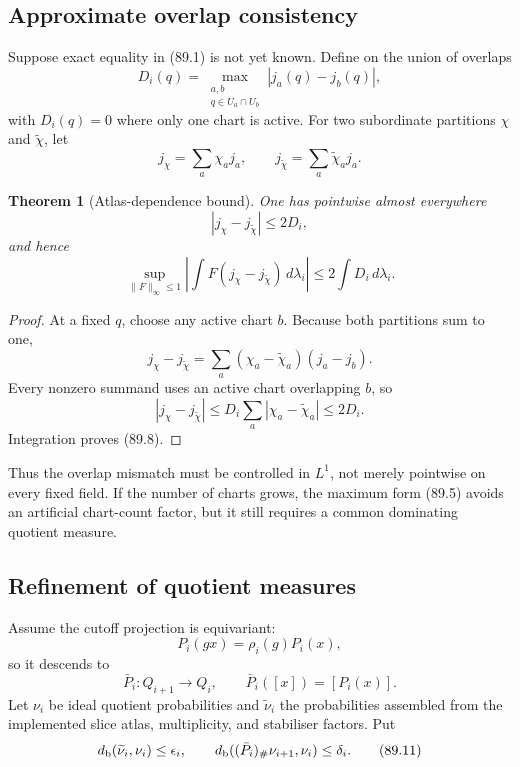 \documentclass[11pt]{article}
\newtheorem{theorem}{Theorem}[section]
\begin{document}
\subsection{Approximate overlap consistency}

Suppose exact equality in (89.1) is not yet known.  Define on the
union of overlaps
\[
 D_i(q)=
 \max_{\substack{a,b\\q\in U_a\cap U_b}}|j_a(q)-j_b(q)|,     \tag{89.5}
\]
with \(D_i(q)=0\) where only one chart is active.  For two subordinate
partitions \(\chi\) and \(\widetilde\chi\), let
\[
 j_\chi=\sum_a\chi_aj_a,\qquad
 j_{\widetilde\chi}=\sum_a\widetilde\chi_aj_a.               \tag{89.6}
\]

\begin{theorem}[Atlas-dependence bound]
\label{thm:v11v89-atlas}
One has pointwise almost everywhere
\[
                              |j_\chi-j_{\widetilde\chi}|
                              \le2D_i,                        \tag{89.7}
\]
and hence
\[
 \sup_{\|F\|_\infty\le1}
 \left|\int F(j_\chi-j_{\widetilde\chi})\,d\lambda_i\right|
                       \le2\int D_i\,d\lambda_i.             \tag{89.8}
\]
\end{theorem}

\begin{proof}
At a fixed \(q\), choose any active chart \(b\).  Because both
partitions sum to one,
\[
 j_\chi-j_{\widetilde\chi}
 =\sum_a(\chi_a-\widetilde\chi_a)(j_a-j_b).
\]
Every nonzero summand uses an active chart overlapping \(b\), so
\[
 |j_\chi-j_{\widetilde\chi}|
 \le D_i\sum_a|\chi_a-\widetilde\chi_a|
 \le2D_i.
\]
Integration proves (89.8).
\end{proof}

Thus the overlap mismatch must be controlled in \(L^1\), not merely
pointwise on every fixed field.  If the number of charts grows, the
maximum form (89.5) avoids an artificial chart-count factor, but it
still requires a common dominating quotient measure.

\subsection{Refinement of quotient measures}

Assume the cutoff projection is equivariant:
\[
                        P_i(gx)=\rho_i(g)P_i(x),             \tag{89.9}
\]
so it descends to
\[
                     \bar P_i:Q_{i+1}\longrightarrow Q_i,
                      \qquad \bar P_i([x])=[P_i(x)].         \tag{89.10}
\]
Let \(\nu_i\) be ideal quotient probabilities and
\(\widetilde\nu_i\) the probabilities assembled from the implemented
slice atlas, multiplicity, and stabiliser factors.  Put
\[
 d_{\rm b}(\widetilde\nu_i,\nu_i)\le\epsilon_i,\qquad
 d_{\rm b}((\bar P_i)_\#\nu_{i+1},\nu_i)\le\delta_i.         \tag{89.11}
\]
\end{document}
